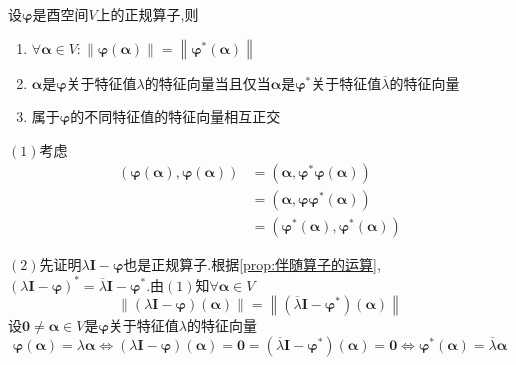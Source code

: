 \begin{green}
    \begin{lemma}\label{lem:正规算子的范数、特征值、特征向量}
        设$\bm{\varphi}$是酉空间$V$上的正规算子,则\begin{enumerate}[label={\textup{(\arabic*)}}]
            \item $\forall\bm{\alpha}\in V:\left\lVert\bm{\varphi}\left(\bm{\alpha}\right)\right\rVert=\left\lVert\bm{\varphi}^*\left(\bm{\alpha}\right)\right\rVert$
            \item $\bm{\alpha}$是$\bm{\varphi}$关于特征值$\lambda$的特征向量当且仅当$\bm{\alpha}$是$\bm{\varphi}^*$关于特征值$\overline{\lambda}$的特征向量
            \item 属于$\bm{\varphi}$的不同特征值的特征向量相互正交
        \end{enumerate}
    \end{lemma}
    \begin{Proof}
        $(1)$考虑\begin{align*}
            \left(
                \bm{\varphi}\left(\bm{\alpha}\right),\bm{\varphi}\left(\bm{\alpha}\right)
            \right)&=\left(
                \bm{\alpha},\bm{\varphi}^*\bm{\varphi}\left(\bm{\alpha}\right)
            \right)\\
            &=\left(
                \bm{\alpha},\bm{\varphi}\bm{\varphi}^*\left(\bm{\alpha}\right)
            \right)\\
            &=\left(
                \bm{\varphi}^*\left(\bm{\alpha}\right),\bm{\varphi}^*\left(\bm{\alpha}\right)
            \right)
        \end{align*}

        $(2)$先证明$\lambda\bm{I}-\bm{\varphi}$也是正规算子.根据\cref{prop:伴随算子的运算},$\left(
            \lambda\bm{I}-\bm{\varphi}
        \right)^*=\overline{\lambda}\bm{I}-\bm{\varphi}^*.$由$(1)$知$\forall\bm{\alpha}\in V$\[
        \left\lVert\left(
            \lambda\bm{I}-\bm{\varphi}\right)\left(\bm{\alpha}\right)\right\rVert=\left\lVert\left(
            \overline{\lambda}\bm{I}-\bm{\varphi}^*\right)\left(\bm{\alpha}\right)\right\rVert
        \]设$\bm{0}\neq\bm{\alpha}\in V$是$\bm{\varphi}$关于特征值$\lambda$的特征向量\[\bm{\varphi}\left(\bm{\alpha}\right)=\lambda\bm{\alpha}\Longleftrightarrow\left(
            \lambda\bm{I}-\bm{\varphi}
        \right)\left(\bm{\alpha}\right)=\bm{0}=\left(
            \overline{\lambda}\bm{I}-\bm{\varphi}^*
        \right)\left(
            \bm{\alpha}
        \right)=\bm{0}\Longleftrightarrow\bm{\varphi}^*\left(\bm{\alpha}\right)=\overline{\lambda}\bm{\alpha}\]


\end{Proof}
\end{green}
